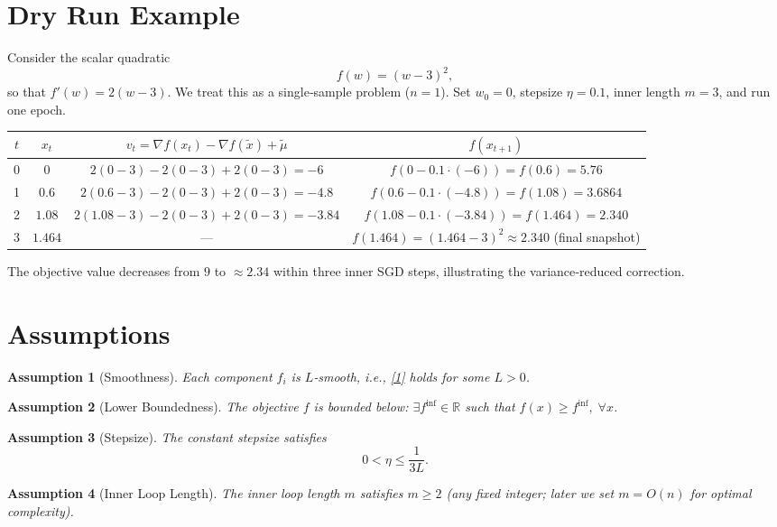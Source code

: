 \documentclass[11pt]{article}
\newtheorem{assumption}{Assumption}
\newcommand{\R}{\mathbb{R}}
\begin{document}
\section*{Dry Run Example}
Consider the scalar quadratic
\[
f(w)=(w-3)^2,
\]
so that $f'(w)=2(w-3)$.  We treat this as a single‑sample problem ($n=1$).  
Set $w_0=0$, stepsize $\eta=0.1$, inner length $m=3$, and run one epoch.

\begin{center}
\begin{tabular}{c|c|c|c}
$t$ & $x_t$ & $v_t=\nabla f(x_t)-\nabla f(\tilde{x})+\tilde{\mu}$ & $f(x_{t+1})$\\\hline
0 & $0$ & $2(0-3)-2(0-3)+2(0-3)= -6$ & $f(0-0.1\cdot(-6))=f(0.6)=5.76$\\
1 & $0.6$ & $2(0.6-3)-2(0-3)+2(0-3)= -4.8$ & $f(0.6-0.1\cdot(-4.8))=f(1.08)=3.6864$\\
2 & $1.08$ & $2(1.08-3)-2(0-3)+2(0-3)= -3.84$ & $f(1.08-0.1\cdot(-3.84))=f(1.464)=2.340$\\
3 & $1.464$ & --- & $f(1.464)= (1.464-3)^2\approx2.340$ (final snapshot)
\end{tabular}
\end{center}
The objective value decreases from $9$ to $\approx2.34$ within three inner SGD steps, illustrating the variance‑reduced correction.

\newpage
\section*{Assumptions}
\begin{assumption}[Smoothness]\label{ass:smooth}
Each component $f_i$ is $L$‑smooth, i.e., \eqref{1} holds for some $L>0$.
\end{assumption}
\begin{assumption}[Lower Boundedness]\label{ass:lb}
The objective $f$ is bounded below: $\exists f^{\inf}\in\R$ such that $f(x)\ge f^{\inf},\;\forall x$.
\end{assumption}
\begin{assumption}[Stepsize]\label{ass:stepsize}
The constant stepsize satisfies
\[
0<\eta\le\frac{1}{3L}.
\tag{6}
\]
\end{assumption}
\begin{assumption}[Inner Loop Length]\label{ass:inner}
The inner loop length $m$ satisfies $m\ge 2$ (any fixed integer; later we set $m=O(n)$ for optimal complexity).
\end{assumption}
\end{document}
